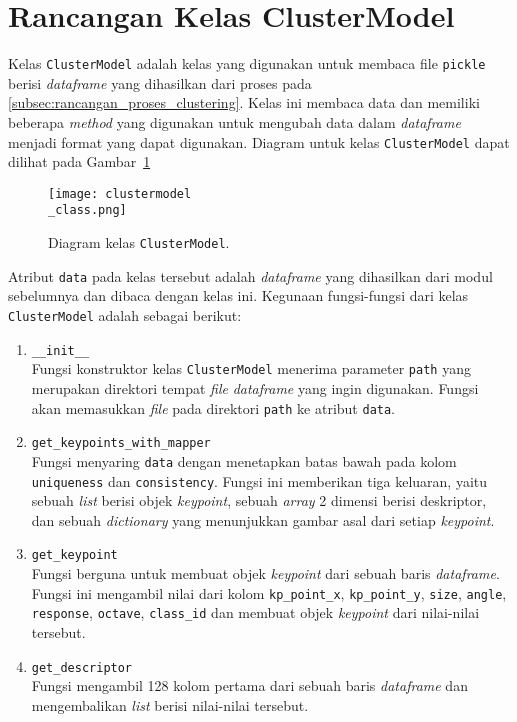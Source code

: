 \section{Rancangan Kelas ClusterModel}
\label{sec:clustermodel_class}
Kelas \texttt{ClusterModel} adalah kelas yang digunakan untuk membaca file \texttt{pickle} berisi \textit{dataframe} yang dihasilkan dari proses pada \ref{subsec:rancangan_proses_clustering}. Kelas ini membaca data dan memiliki beberapa \textit{method} yang digunakan untuk mengubah data dalam \textit{dataframe} menjadi format yang dapat digunakan. Diagram untuk kelas \texttt{ClusterModel} dapat dilihat pada Gambar~\ref{fig:clustermodel_class}
\begin{figure}[H]
	\centering
	\texttt{[image: clustermodel\\\_class.png]}
	\caption{Diagram kelas \texttt{ClusterModel}.}
	\label{fig:clustermodel_class}
\end{figure}
Atribut \texttt{data} pada kelas tersebut adalah \textit{dataframe} yang dihasilkan dari modul sebelumnya dan dibaca dengan kelas ini. Kegunaan fungsi-fungsi dari kelas \texttt{ClusterModel} adalah sebagai berikut:
\begin{enumerate}
	\item \texttt{\_\_init\_\_} \\
	Fungsi konstruktor kelas \texttt{ClusterModel} menerima parameter \texttt{path} yang merupakan direktori tempat \textit{file} \textit{dataframe} yang ingin digunakan. Fungsi akan memasukkan \textit{file} pada direktori \texttt{path} ke atribut \texttt{data}.
	\item \texttt{get\_keypoints\_with\_mapper} \\
	Fungsi menyaring \texttt{data} dengan menetapkan batas bawah pada kolom \texttt{uniqueness} dan \texttt{consistency}. Fungsi ini memberikan tiga keluaran, yaitu sebuah \textit{list} berisi objek \textit{keypoint}, sebuah \textit{array} 2 dimensi berisi deskriptor, dan sebuah \textit{dictionary} yang menunjukkan gambar asal dari setiap \textit{keypoint}.
	\item \texttt{get\_keypoint} \\
	Fungsi berguna untuk membuat objek \textit{keypoint} dari sebuah baris \textit{dataframe}. Fungsi ini mengambil nilai dari kolom \texttt{kp\_point\_x}, \texttt{kp\_point\_y}, \texttt{size}, \texttt{angle}, \texttt{response}, \texttt{octave}, \texttt{class\_id} dan membuat objek \textit{keypoint} dari nilai-nilai tersebut.
	\item \texttt{get\_descriptor} \\
	Fungsi mengambil 128 kolom pertama dari sebuah baris \textit{dataframe} dan mengembalikan \textit{list} berisi nilai-nilai tersebut.
\end{enumerate}

